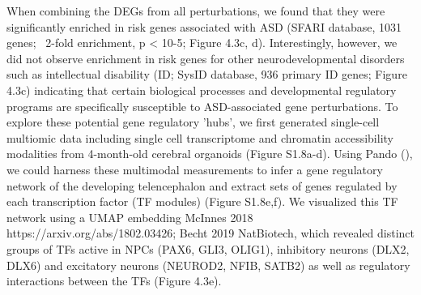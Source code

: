When combining the DEGs from all perturbations, we found that they were significantly enriched in risk genes associated with ASD (SFARI database, 1031 genes; ~2-fold enrichment, p < 10-5; Figure 4.3c, d). Interestingly, however, we did not observe enrichment in risk genes for other neurodevelopmental disorders such as intellectual disability (ID; SysID database, 936 primary ID genes; Figure 4.3c) indicating that certain biological processes and developmental regulatory programs are specifically susceptible to ASD-associated gene perturbations. To explore these potential gene regulatory 'hubs', we first generated single-cell multiomic data including single cell transcriptome and chromatin accessibility modalities from 4-month-old cerebral organoids (Figure S1.8a-d). Using Pando (\cite{fleck_inferring_2021}), we could harness these multimodal measurements to infer a gene regulatory network of the developing telencephalon and extract sets of genes regulated by each transcription factor (TF modules) (Figure S1.8e,f). We visualized this TF network using a UMAP embedding {McInnes 2018 https://arxiv.org/abs/1802.03426; Becht 2019 NatBiotech}, which revealed distinct groups of TFs active in NPCs (PAX6, GLI3, OLIG1), inhibitory neurons (DLX2, DLX6) and excitatory neurons (NEUROD2, NFIB, SATB2) as well as regulatory interactions between the TFs (Figure 4.3e). 

